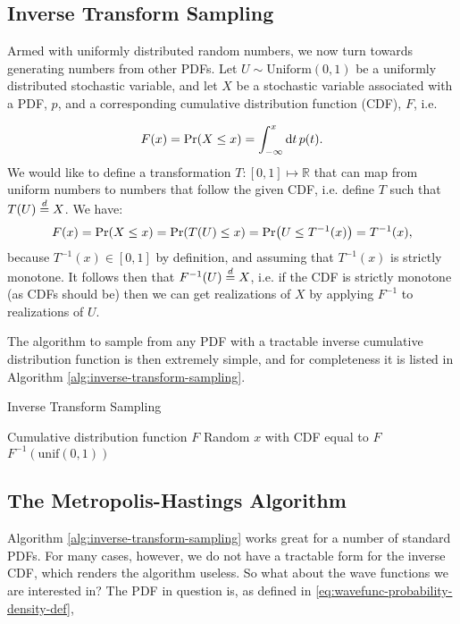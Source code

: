 \documentclass[Thesis.tex]{subfiles}
\begin{document}
\subsection{Inverse Transform Sampling}

Armed with uniformly distributed random numbers, we now turn towards generating
numbers from other PDFs. Let $U\sim\text{Uniform}(0,1)$ be a uniformly
distributed stochastic variable, and let $X$ be a stochastic variable
associated with a PDF, $p$, and a corresponding cumulative distribution
function (CDF), $F$, i.e.

\begin{align}
    F(x) = \text{Pr}\qty(X\leq x) = \int_{-\infty}^x \dd{t}p(t).
\end{align}
We would like to define a transformation $T:[0, 1]\mapsto\mathbb{R}$ that can map from uniform numbers to numbers that follow the given CDF, i.e. define $T$ such that $T(U)\overset{d}{=} X$. We have:
\begin{align}
    F(x) = \text{Pr}\qty(X\leq x) = \text{Pr}\qty(T(U)\leq x) = \text{Pr}\qty(U \leq T^{-1}(x)) = T^{-1}(x),
\end{align}
because $T^{-1}(x)\in[0, 1]$ by definition, and assuming that $T^{-1}(x)$ is strictly monotone. It follows then that $F^{-1}(U)\overset{d}{=} X$, i.e. if the CDF is strictly monotone (as CDFs should be) then we can get realizations of $X$ by applying $F^{-1}$ to realizations of $U$.

The algorithm to sample from any PDF with a tractable inverse cumulative
distribution function is then extremely simple, and for completeness it is
listed in Algorithm \autoref{alg:inverse-transform-sampling}.

\begin{algorithm}[h]
    \caption{Inverse Transform Sampling}
    \label{alg:inverse-transform-sampling}
    \begin{algorithmic}[1]
        \Require Cumulative distribution function $F$
        \Ensure Random $x$ with CDF equal to $F$
        \Repeat
          \State \Yield $F^{-1}(\text{unif}(0, 1))$
    \end{algorithmic}
\end{algorithm}

\subsection{The Metropolis-Hastings Algorithm}
\label{sec:metro-hastings-alg}

Algorithm \autoref{alg:inverse-transform-sampling} works great for a number of standard
PDFs. For many cases, however, we do not have a tractable form for the inverse
CDF, which renders the algorithm useless. So what about the wave functions we
are interested in? The PDF in question is, as defined in \autoref{eq:wavefunc-probability-density-def},
\end{document}
